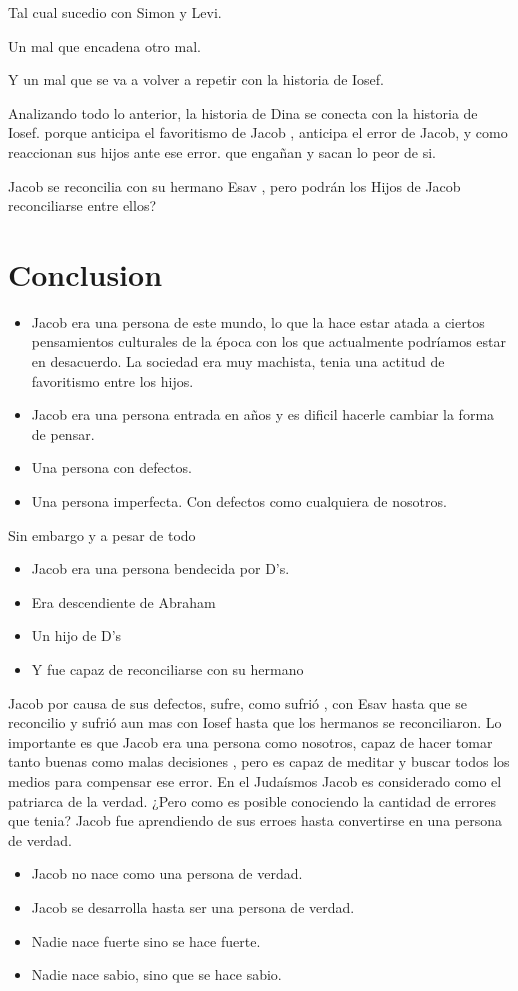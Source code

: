\documentclass[conference]{IEEEtran}
\begin{document}
Tal cual sucedio con Simon y Levi.

Un mal que encadena otro mal.

Y un mal que se va a volver a repetir con la historia de Iosef.

Analizando todo lo anterior, la historia de Dina se conecta con la historia de Iosef.
porque anticipa el favoritismo de Jacob , anticipa el error de Jacob, y como reaccionan sus hijos ante ese error.
que engañan y sacan lo peor de si.




Jacob se reconcilia con su hermano Esav , pero podrán los Hijos de Jacob reconciliarse entre ellos?




\section{Conclusion}
\begin{itemize}
\item
Jacob era una persona de este mundo, lo que la hace estar atada a ciertos pensamientos 
culturales de la época con los que actualmente podríamos estar en desacuerdo.
La sociedad era muy machista, tenia una actitud de favoritismo entre los hijos.
\item
Jacob era una persona entrada en años y es dificil hacerle cambiar la forma de pensar.
\item
Una persona con defectos.
\item
Una persona imperfecta.
Con defectos como cualquiera de nosotros. 

\end{itemize}

Sin embargo y a pesar de todo
\begin{itemize}
\item
Jacob era una persona bendecida por D's.
\item
Era descendiente de Abraham 
\item
Un hijo de D's
\item
Y fue capaz de reconciliarse con su hermano
\end{itemize}


Jacob por causa de sus defectos, sufre, como sufrió , con Esav hasta que se reconcilio y sufrió aun mas con Iosef
hasta que los hermanos se reconciliaron.
Lo importante es que Jacob era una persona como nosotros, capaz de hacer tomar tanto  buenas como malas decisiones , pero es capaz de meditar y buscar todos los medios para compensar ese error. 
En el Judaísmos Jacob es considerado como el patriarca de la verdad.  ¿Pero como es posible conociendo la cantidad de errores que tenia? Jacob fue aprendiendo de sus erroes hasta convertirse en una persona de verdad.

\begin{itemize}
\item Jacob no  nace como una persona de verdad.
\item Jacob se desarrolla hasta ser una persona de verdad.
\item Nadie nace fuerte sino se hace fuerte.
\item Nadie nace sabio, sino que se hace sabio.
\end{itemize}




\end{document}
